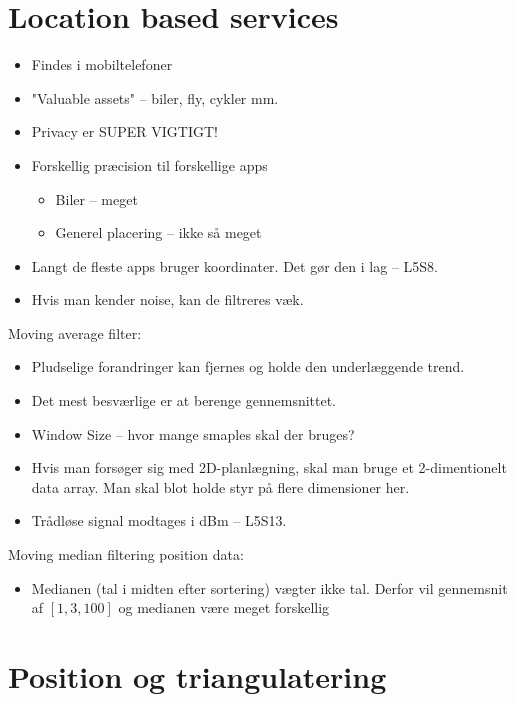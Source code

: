 \documentclass[oneside, 10pt]{article}
\begin{document}
\newpage
\section{Location based services}

\begin{itemize}
	\item Findes i mobiltelefoner
	\item "Valuable assets" --  biler, fly, cykler mm.
	\item Privacy er SUPER VIGTIGT!
	\item Forskellig præcision til forskellige apps
	\begin{itemize}
		\item Biler -- meget
		\item Generel placering -- ikke så meget
	\end{itemize}

	\item Langt de fleste apps bruger koordinater. Det gør den i lag -- L5S8.
	\item Hvis man kender noise, kan de filtreres væk.
\end{itemize}

Moving average filter:
\begin{itemize}
	\item Pludselige forandringer kan fjernes og holde den underlæggende trend.
	\item Det mest besværlige er at berenge gennemsnittet.
	\item Window Size -- hvor mange smaples skal der bruges?
	\item Hvis man forsøger sig med 2D-planlægning, skal man bruge et 2-dimentionelt data array. Man skal blot holde styr på flere dimensioner her.
	\item Trådløse signal modtages i dBm -- L5S13.
\end{itemize}

Moving median filtering position data:
\begin{itemize}
	\item Medianen (tal i midten efter sortering) vægter ikke tal. Derfor vil gennemsnit af $[1, 3, 100 ]$ og medianen være meget forskellig
\end{itemize}








\newpage
\section{Position og triangulatering}
\end{document}
